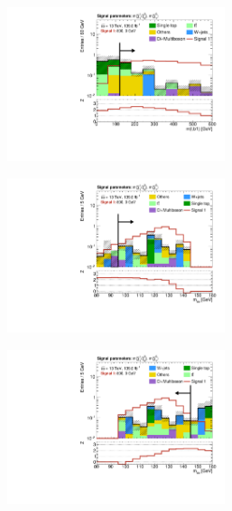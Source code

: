\begin{figure}
\begin{subfigure}[b]{0.5\linewidth}
		\caption{}
	\end{subfigure}\hfill
	\begin{subfigure}[b]{0.5\linewidth}
		\centering\includegraphics[width=0.7\textwidth]{N-1_cut_scan/n1_800_0/mlb1}
		\caption{}
	\end{subfigure}\hfill
	\begin{subfigure}[b]{0.5\linewidth}
		\centering\includegraphics[width=0.7\textwidth]{N-1_cut_scan/n1_800_0/mbb_lower}
		\caption{}
	\end{subfigure}\hfill
	\begin{subfigure}[b]{0.5\linewidth}
		\centering\includegraphics[width=0.7\textwidth]{N-1_cut_scan/n1_800_0/mbb_upper}

\end{subfigure}
\end{figure}
